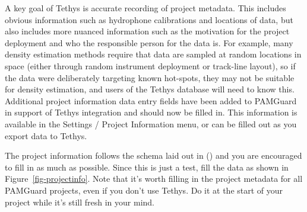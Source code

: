 \documentclass[
]{article}
\begin{document}
A key goal of Tethys is accurate recording of project metadata. This
includes obvious information such as hydrophone calibrations and
locations of data, but also includes more nuanced information such as
the motivation for the project deployment and who the responsible person
for the data is. For example, many density estimation methods require
that data are sampled at random locations in space (either through
random instrument deployment or track-line layout), so if the data were
deliberately targeting known hot-spots, they may not be suitable for
density estimation, and users of the Tethys database will need to know
this. Additional project information data entry fields have been added
to PAMGuard in support of Tethys integration and should now be filled
in. This information is available in the Settings / Project Information
menu, or can be filled out as you export data to Tethys.

The project information follows the schema laid out in
() and you are encouraged to
fill in as much as possible. Since this is just a test, fill the data as
shown in Figure~\ref{fig-projectinfo}. Note that it's worth filling in
the project metadata for all PAMGuard projects, even if you don't use
Tethys. Do it at the start of your project while it's still fresh in
your mind.
\end{document}
